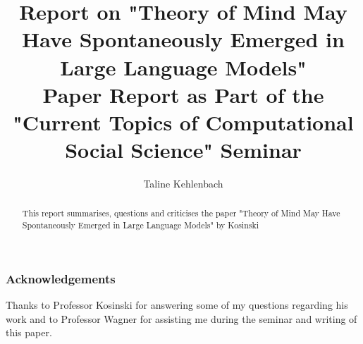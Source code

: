 \documentclass[runningheads]{llncs}
\begin{document}
%
\title{\large Report on "Theory of Mind May Have Spontaneously Emerged in Large Language Models" \\
\normalsize Paper Report as Part of the "Current Topics of Computational Social Science" Seminar}

%
%
\author{Taline Kehlenbach}
%
%
%
\maketitle              %
%
\begin{abstract}
This report summarises, questions and criticises the paper "Theory of Mind May Have Spontaneously Emerged in Large Language Models" by Kosinski

\end{abstract}
%
%
%















\subsubsection{Acknowledgements} Thanks to Professor Kosinski for answering some of my questions regarding his work and to Professor Wagner for assisting me during the seminar and writing of this paper.

%
%
%

%


\end{document}
